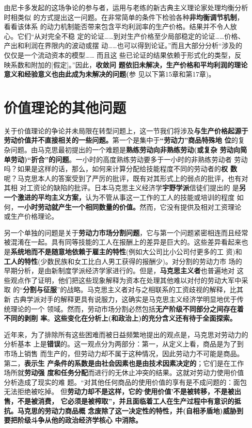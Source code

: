 由尼卡多发起的这场争论的参与者，运用与老练的新古典主义理论家处理均衡分析时相类似
的方式提出这一问题。在非常简单的条件下检验各种\textbf{非均衡调节机制}，看看该体系
的动力机制能否带来包含平均利润率的生产价格。结果并不令人放心。它们“从对完全不稳
定的论证……到对生产价格至少局部稳定的论证……价格、产出和利润在界限内的波动或摆
动……也可以得到论证。”而且大部分分析“涉及的仅仅是一个流动资本的模型…… 而且这
些已论证的结果依赖于形式化的类型，反映系数和附加的[假定]。”因此，\textbf{收敛问
  题依旧未解决，生产价格和平均利润的理论意义和经验意义也由此成为未解决的问题(}参
见以下第15章和第17章)。

\section{价值理论的其他问题}

关于价值理论的争论并未局限在转型问题上，这一节我们将涉及\textbf{与生产价格起源于
  劳动价值并不直接相关的一些问题。}第一个是集中于\textbf{“劳动力”商品特殊地
  位}的复杂问题。由马克思最初提出的一个难题是\textbf{熟练劳动向非熟练劳动(或复杂
  劳动向简单劳动)“折合”的问题}。一小时的高度熟练劳动要多于一小时的非熟练劳动者
劳动吗？如果是这样的话，那么，如何来计算分配给技能程度不同的劳动者的\textbf{权
  数}呢？马克思本人的答案受到了严厉的批评，既有对其形式上的弱点的批评，也有对其相
对工资论的缺陷的批评。日本马克思主义经济学\textbf{宇野学派}信徒们提出的
是\textbf{另一个激进的平均主义方案，}认为不管从事这一工作的工人的技能或培训的程度
如何，\textbf{一小时劳动就产生一个相同数量的价值。}然而，它没有提供及相对工资理论
或生产价格理论。

另一个单独的问题是关于\textbf{劳动力市场分割问题}，它与第一个问题紧密相连而且经常
被混淆在一起。具有同等技能的工人在报酬上的差异是巨大的。这些差异看起来也
是\textbf{系统地而不是随意地依赖于雇主的特性}(例如大公司比小公司付更多的工
资)和\textbf{工人的特性}(少数民族和女工比白人男工获得的报酬少)。对分割的劳动力市
场的早期分析，是由新制度学派经济学家进行的。但是，\textbf{马克思主义者}也普遍地对
这些观点作了证明，他们把这些现象解释为资本在处理其他难以对付的劳动大军中采取
的“\textbf{分割与征服}”的战略。马克思主义者对与之相联系的工资歧视的解释，比其新
古典学派对手的解释更具有说服力，这确实是马克思主义经济学明显地优于传统理论的一个
领域。然而，劳动市场分割必然包括\textbf{无产阶级不同部分之间存在着不同的剥削
  率}。\textbf{这些变化在分析上(和政治上)的充分含义还有待于全面探索。}

近年来，为了排除所有这些困难而被日益频繁地提出的观点是，马克思对劳动力的分析基本
上是\textbf{错误}的。这一观点分为两部分：第一，从定义上看，商品是为了到市场上销售
而生产的，但劳动力却不属于这种情况，因此劳动力不可能是商品。第二，\textbf{表示生
  产条件的系数是由社会因素也是由技术因素决定的}；它们是在工作场所就\textbf{劳动强
  度和任务分配}而进行的无休止冲突的结果。这就对劳动力使用价值分析造成了现实的难
题。“对其他任何商品的使用价值的享有是不成问题的：面包无法拒绝被吃掉。
但\textbf{劳动力却不是这样，它的‘使用价值’不是被转移，不是被出售，不是被消费，
  它必须是被榨取”，并且面临着工人在生产过程中有意识的抵抗。马克思的劳动力商品概
  念废除了这一决定性的特性，并(自相矛盾地)威胁到要把阶级斗争从他的政治经济学核心
  中消除。}

